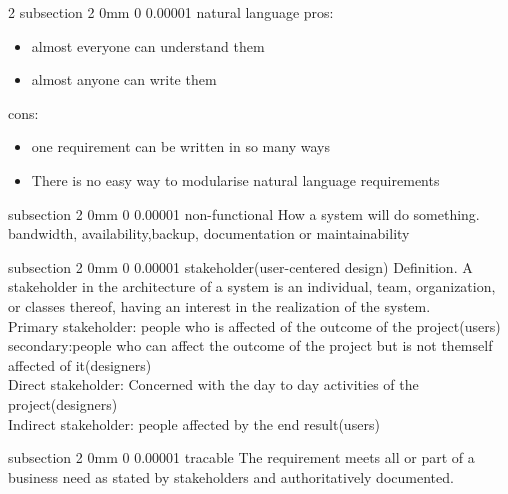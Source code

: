 \documentclass[a4paper,11pt]{article}
\makeatletter
\renewcommand{\subsection}{\@startsection
   {subsection}%
   {2}%
   {0mm}%
   {0\baselineskip}%
   {0.00001\baselineskip}%
   {\rmfamily\normalfont\slshape\normalsize}}%
\makeatother
\begin{document}
\begin{multicols}{2}
 \subsection{natural language}
 pros:
 \vspace{0 mm}
 \begin{itemize}
 \setlength\itemsep{0em}
 \item almost everyone can understand them
 \item almost anyone can write them
 \end{itemize}
 cons:
 \vspace{0 mm}
 \begin{itemize}
  \setlength\itemsep{0em}
 \item one requirement can be written in so many ways
 \item There is no easy way to modularise natural language requirements
 \end{itemize}

\subsection{non-functional}
 How a system will do something.
\\bandwidth, availability,backup, documentation or maintainability

\subsection{stakeholder(user-centered design)}
Definition. A stakeholder in the architecture of a system is an individual, team, organization, or classes thereof, having an interest in the realization of the system. \\
Primary stakeholder: people who is affected of the outcome of the project(users)
\\secondary:people who can affect the outcome of the project but is not themself affected of it(designers)
\\ Direct stakeholder: Concerned with the day to day activities of the project(designers)
\\Indirect stakeholder: people affected by the end result(users)

\subsection{tracable}
The requirement meets all or part of a business need as stated by stakeholders and authoritatively documented.


\end{multicols}
\end{document}
